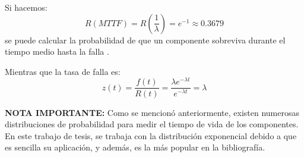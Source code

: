 Si hacemos: $$R(MTTF) = R(\frac{1}{\lambda}) = e^{-1}\approx 0.3679$$  se puede calcular la probabilidad de que un componente sobreviva durante el
tiempo medio hasta la falla \citep{Rausand04}.

Mientras que la tasa de falla es: $$z(t) = \frac{f(t)}{R(t)} = \frac{\lambda e^{-\lambda t}}{e^{-\lambda t}} = \lambda $$

\textbf{NOTA IMPORTANTE:} Como se mencionó anteriormente, existen numerosas distribuciones
de probabilidad para medir el tiempo de vida de los componentes. En este trabajo de tesis,
se trabaja con la distribución exponencial debido a que es sencilla su aplicación, y además,
es la más popular en la bibliografía.
